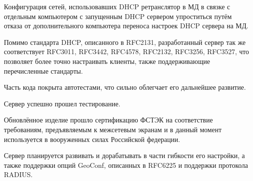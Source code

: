 \documentclass[14pt,a4paper]{extarticle}
\begin{document}
Конфигурация сетей, использовавших DHCP ретранслятор в МД в связке с отдельным компьютером с запущенным DHCP сервером упроститься путём отказа от дополнительного компьютера переноса настроек DHCP сервера на МД.

Помимо стандарта DHCP, описанного в RFC2131, разработанный сервер так же соответствует RFC3011, RFC3442, RFC4578, RFC2132, RFC3256, RFC3527, что позволяет более точно настраивать клиенты, также поддерживающие перечисленные стандарты.

Часть кода покрыта автотестами, что сильно облегчает его дальнейшее развитие.

Сервер успешно прошел тестирование.

Обновлённое изделие прошло сертификацию ФСТЭК на соответствие требованиям, предъявляемым к межсетевым экранам и в данный момент используется в вооруженных силах Российской федерации.

Сервер планируется развивать и дорабатывать в части гибкости его настройки, а также поддержки опций GeoConf, описанных в RFC6225 и поддержки протокола RADIUS.

\pagebreak
{}
\end{document}
